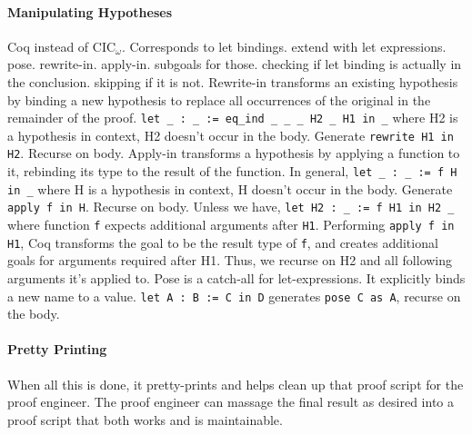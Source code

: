 \paragraph{Manipulating Hypotheses}
Coq instead of CIC$_{\omega}$.
Corresponds to let bindings.
extend with let expressions. pose. rewrite-in. apply-in. subgoals for those.
checking if let binding is actually in the conclusion.
skipping if it is not.
Rewrite-in transforms an existing hypothesis by binding a new hypothesis to replace all occurrences of the original in the remainder of the proof.
\lstinline{let _ : _ := eq_ind _ _ _ H2 _ H1 in _} where
		H2 is a hypothesis in context,
		H2 doesn’t occur in the body.
		Generate \lstinline{rewrite H1 in H2}. Recurse on body.
Apply-in transforms a hypothesis by applying a function to it, rebinding its type to the result of the function.
		In general,
		\lstinline{let _ : _ := f H in _} where
		H is a hypothesis in context,
		H doesn’t occur in the body.
		Generate  \lstinline{apply f in H}. Recurse on body.
		Unless we have,
		\lstinline{let H2 : _ := f H1 in H2 _} where
function \lstinline{f} expects additional arguments after \lstinline{H1}.
Performing \lstinline{apply f in H1}, Coq transforms the goal to be the result type of \lstinline{f}, and creates additional goals for arguments required after H1. Thus, we recurse on H2 and all following arguments it’s applied to.
Pose is a catch-all for let-expressions. It explicitly binds a new name to a value.
\lstinline{let A : B := C in D} generates \lstinline{pose C as A}, recurse on the body.

\paragraph{Pretty Printing}
When all this is done, it pretty-prints and helps clean up that proof script for the proof engineer.
The proof engineer can massage the final result as desired into a proof script that both works and is maintainable.





